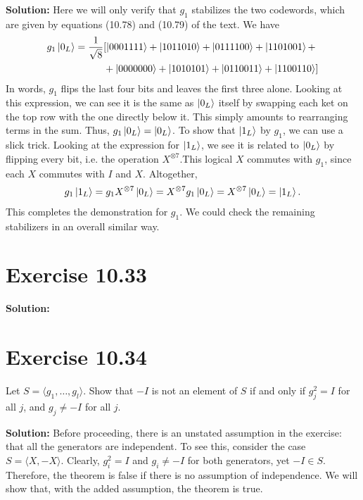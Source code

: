 \documentclass{book}
\begin{document}
    \textbf{Solution:} Here we will only verify that $g_1$ stabilizes the two codewords, which are given by equations (10.78) and (10.79) of the text. We have
    \begin{align}
    \begin{aligned}
        g_1\ket{0_L} = \frac{1}{\sqrt{8}}&[\ket{0001111}+\ket{1011010}+\ket{0111100}+\ket{1101001} + \\
        &+\ket{0000000}+\ket{1010101}+\ket{0110011}+\ket{1100110}] \\
    \end{aligned}
    \end{align}
    In words, $g_1$ flips the last four bits and leaves the first three alone. Looking at this expression, we can see it is the same as $\ket{0_L}$ itself by swapping each ket on the top row with the one directly below it. This simply amounts to rearranging terms in the sum. Thus, $g_1\ket{0_L} = \ket{0_L}$. To show that $\ket{1_L}$ by $g_1$, we can use a slick trick. Looking at the expression for $\ket{1_L}$, we see it is related to $\ket{0_L}$ by flipping every bit, i.e. the operation $X^{\otimes 7}$.This logical $X$ commutes with $g_1$, since each $X$ commutes with $I$ and $X$. Altogether,
    \begin{align}
        g_1\ket{1_L} = g_1 X^{\otimes 7}\ket{0_L} = X^{\otimes 7} g_1 \ket{0_L} = X^{\otimes 7} \ket{0_L} = \ket{1_L}.
    \end{align}
    This completes the demonstration for $g_1$. We could check the remaining stabilizers in an overall similar way.
    
\section*{Exercise 10.33}
    \textbf{Solution:}
    
\section*{Exercise 10.34}
    Let $S = \langle g_1,\dots,g_l\rangle$. Show that $-I$ is not an element of $S$ if and only if $g_j^2 =I$ for all $j$, and $g_j \neq -I$ for all $j$.
    
    \textbf{Solution:} Before proceeding, there is an unstated assumption in the exercise: that all the generators are independent. To see this, consider the case $S = \langle X, -X \rangle$. Clearly, $g_i^2 = I$ and $g_i \neq -I$ for both generators, yet $-I \in S$. Therefore, the theorem is false if there is no assumption of independence. We will show that, with the added assumption, the theorem is true.
    
\end{document}
